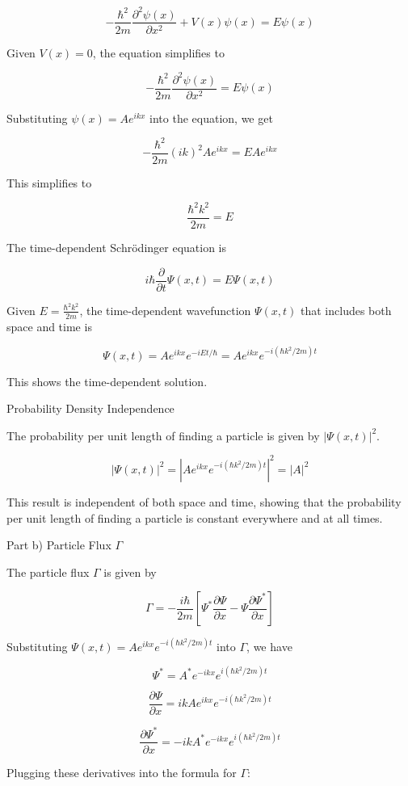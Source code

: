 \[
-\frac{\hbar^2}{2m} \frac{\partial^2 \psi(x)}{\partial x^2} + V(x)\psi(x) = E\psi(x)
\]

Given \( V(x) = 0 \), the equation simplifies to

\[
-\frac{\hbar^2}{2m} \frac{\partial^2 \psi(x)}{\partial x^2} = E\psi(x)
\]

Substituting \( \psi(x) = Ae^{ikx} \) into the equation, we get

\[
-\frac{\hbar^2}{2m} (ik)^2 Ae^{ikx} = EAe^{ikx}
\]

This simplifies to

\[
\frac{\hbar^2k^2}{2m} = E
\]

The time-dependent Schrödinger equation is

\[
i\hbar \frac{\partial}{\partial t} \Psi(x,t) = E\Psi(x,t)
\]

Given \( E = \frac{\hbar^2k^2}{2m} \), the time-dependent wavefunction \( \Psi(x,t) \) that includes both space and time is

\[
\Psi(x,t) = Ae^{ikx}e^{-iEt/\hbar} = Ae^{ikx}e^{-i(\hbar k^2/2m)t}
\]

This shows the time-dependent solution.

Probability Density Independence

The probability per unit length of finding a particle is given by \( |\Psi(x,t)|^2 \).

\[
|\Psi(x,t)|^2 = |Ae^{ikx}e^{-i(\hbar k^2/2m)t}|^2 = |A|^2
\]

This result is independent of both space and time, showing that the probability per unit length of finding a particle is constant everywhere and at all times.

Part b) Particle Flux \( \Gamma \)

The particle flux \( \Gamma \) is given by

\[
\Gamma = -\frac{i\hbar}{2m}\left[ \Psi^{*}\frac{\partial\Psi}{\partial x} - \Psi\frac{\partial\Psi^{*}}{\partial x} \right]
\]

Substituting \( \Psi(x,t) = Ae^{ikx}e^{-i(\hbar k^2/2m)t} \) into \( \Gamma \), we have

\[
\Psi^{*} = A^*e^{-ikx}e^{i(\hbar k^2/2m)t}
\]

\[
\frac{\partial\Psi}{\partial x} = ikAe^{ikx}e^{-i(\hbar k^2/2m)t}
\]

\[
\frac{\partial\Psi^{*}}{\partial x} = -ikA^*e^{-ikx}e^{i(\hbar k^2/2m)t}
\]

Plugging these derivatives into the formula for \( \Gamma \):

